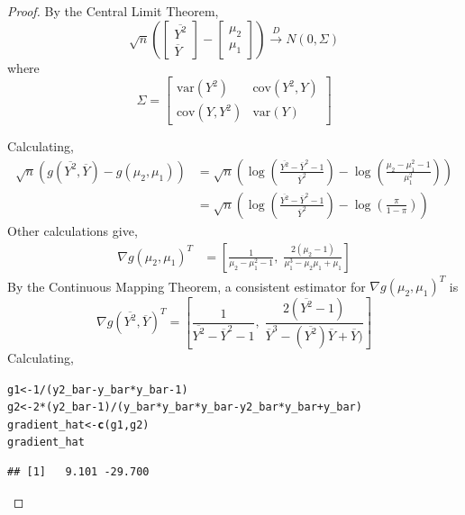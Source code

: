 \documentclass[letterpaper, 12pt]{article}\usepackage[]{graphicx}\usepackage[]{color}
\makeatletter
\newcommand{\hlnum}[1]{\textcolor[rgb]{0.686,0.059,0.569}{#1}}%
\newcommand{\hlopt}[1]{\textcolor[rgb]{0,0,0}{#1}}%
\newcommand{\hlstd}[1]{\textcolor[rgb]{0.345,0.345,0.345}{#1}}%
\newcommand{\hlkwb}[1]{\textcolor[rgb]{0.69,0.353,0.396}{#1}}%
\newcommand{\hlkwd}[1]{\textcolor[rgb]{0.737,0.353,0.396}{\textbf{#1}}}%
\newenvironment{kframe}{%
 \def\at@end@of@kframe{}%
 \ifinner\ifhmode%
  \def\at@end@of@kframe{\end{minipage}}%
  \begin{minipage}{\columnwidth}%
 \fi\fi%
 \def\FrameCommand##1{\hskip\@totalleftmargin \hskip-\fboxsep
 \colorbox{shadecolor}{##1}\hskip-\fboxsep
     \hskip-\linewidth \hskip-\@totalleftmargin \hskip\columnwidth}%
 \MakeFramed {\advance\hsize-\width
   \@totalleftmargin\z@ \linewidth\hsize
   \@setminipage}}%
 {\par\unskip\endMakeFramed%
 \at@end@of@kframe}
\newenvironment{knitrout}{}{} %
\newcommand{\cov}{\text{cov}}
\newcommand{\var}{\text{var}}
\makeatother
\begin{document}
\begin{enumerate}
\begin{enumerate}
\begin{proof}
By the Central Limit Theorem,
\[
\sqrt{n}
\left(
\begin{bmatrix}
\overline{Y^2}\\
\overline{Y}
\end{bmatrix}
-
\begin{bmatrix}
\mu_2 
\\
\mu_1
\end{bmatrix}
\right)
\xrightarrow{D}
N(0,\Sigma)
\]
where 
\[
\Sigma = \begin{bmatrix}
\var(Y^2) & \cov(Y^2, Y) \\
\cov(Y, Y^2) & \var(Y)
\end{bmatrix}
\]

Calculating,
\begin{align*}
\sqrt{n}(g(\overline{Y^2}, \overline{Y}) - g(\mu_2, \mu_1))
&=
\sqrt{n}
\left(
\log \left(
\frac{\overline{Y^2} - \overline{Y}^2 - 1}{\overline{Y}^2}
\right)
-
\log \left(
\frac{\mu_2 - \mu_1^2 - 1}{\mu_1^2}
\right)
\right)
\\
&=
\sqrt{n}
\left(
\log \left(
\frac{\overline{Y^2} - \overline{Y}^2 - 1}{\overline{Y}^2}
\right)
-
\log \left(
\frac{\pi}{1-\pi}
\right)
\right)
\end{align*}
Other calculations give,
\begin{align*}
\nabla g (\mu_2, \mu_1)^T
&= 
\left[
\frac{1}{\mu_2 - \mu_1^2 - 1}, \;
\frac{2 (\mu_2 - 1)}{\mu_1^3 - \mu_2\mu_1 +\mu_1}
\right]
\end{align*}
By the Continuous Mapping Theorem, a consistent estimator for $\nabla g (\mu_2, \mu_1)^T$ is
\[
\nabla g (\overline{Y^2}, \overline{Y})^T
=
\left[
\frac{1}{\overline{Y^2} - \overline{Y}^2 - 1}, \;
\frac{2 (\overline{Y^2} - 1)}{\overline{Y}^3 - (\overline{Y^2})\overline{Y} +\overline{Y})}
\right]
\]
Calculating,
\begin{knitrout}
\color{fgcolor}\begin{kframe}
\begin{alltt}
\hlstd{g1} \hlkwb{<-} \hlnum{1}\hlopt{/}\hlstd{(y2_bar} \hlopt{-} \hlstd{y_bar} \hlopt{*} \hlstd{y_bar} \hlopt{-} \hlnum{1}\hlstd{)}
\hlstd{g2} \hlkwb{<-} \hlnum{2} \hlopt{*} \hlstd{(y2_bar} \hlopt{-} \hlnum{1}\hlstd{)}\hlopt{/}\hlstd{(y_bar} \hlopt{*} \hlstd{y_bar} \hlopt{*} \hlstd{y_bar} \hlopt{-} \hlstd{y2_bar} \hlopt{*} \hlstd{y_bar} \hlopt{+} \hlstd{y_bar)}
\hlstd{gradient_hat} \hlkwb{<-} \hlkwd{c}\hlstd{(g1, g2)}
\hlstd{gradient_hat}
\end{alltt}
\begin{verbatim}
## [1]   9.101 -29.700
\end{verbatim}
\end{kframe}
\end{knitrout}


\end{proof}
\end{enumerate}
\end{enumerate}
\end{document}
